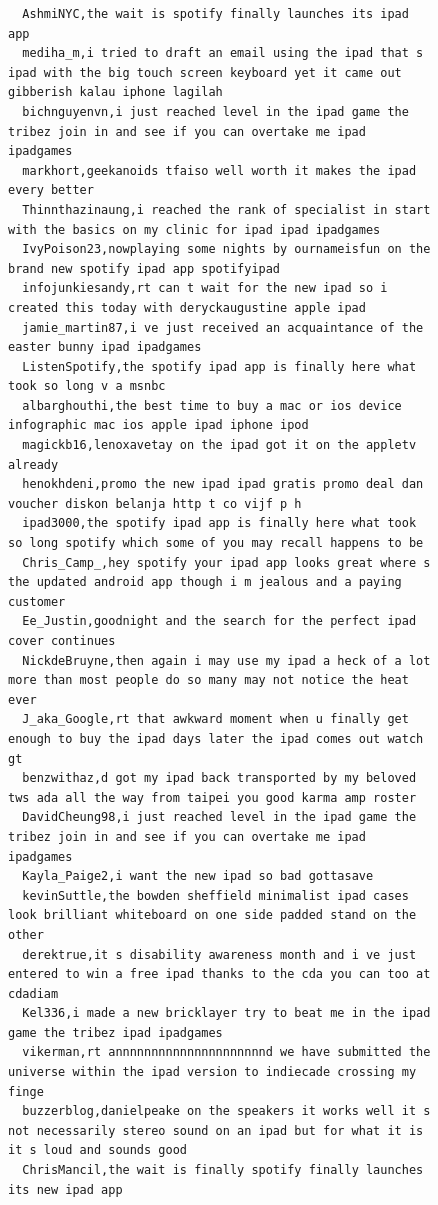 \begin{figure}[htpb]
\begin{verbatim}
  AshmiNYC,the wait is spotify finally launches its ipad app
  mediha_m,i tried to draft an email using the ipad that s ipad with the big touch screen keyboard yet it came out gibberish kalau iphone lagilah
  bichnguyenvn,i just reached level in the ipad game the tribez join in and see if you can overtake me ipad ipadgames
  markhort,geekanoids tfaiso well worth it makes the ipad every better
  Thinnthazinaung,i reached the rank of specialist in start with the basics on my clinic for ipad ipad ipadgames
  IvyPoison23,nowplaying some nights by ournameisfun on the brand new spotify ipad app spotifyipad
  infojunkiesandy,rt can t wait for the new ipad so i created this today with deryckaugustine apple ipad
  jamie_martin87,i ve just received an acquaintance of the easter bunny ipad ipadgames
  ListenSpotify,the spotify ipad app is finally here what took so long v a msnbc
  albarghouthi,the best time to buy a mac or ios device infographic mac ios apple ipad iphone ipod
  magickb16,lenoxavetay on the ipad got it on the appletv already
  henokhdeni,promo the new ipad ipad gratis promo deal dan voucher diskon belanja http t co vijf p h
  ipad3000,the spotify ipad app is finally here what took so long spotify which some of you may recall happens to be
  Chris_Camp_,hey spotify your ipad app looks great where s the updated android app though i m jealous and a paying customer
  Ee_Justin,goodnight and the search for the perfect ipad cover continues
  NickdeBruyne,then again i may use my ipad a heck of a lot more than most people do so many may not notice the heat ever
  J_aka_Google,rt that awkward moment when u finally get enough to buy the ipad days later the ipad comes out watch gt
  benzwithaz,d got my ipad back transported by my beloved tws ada all the way from taipei you good karma amp roster
  DavidCheung98,i just reached level in the ipad game the tribez join in and see if you can overtake me ipad ipadgames
  Kayla_Paige2,i want the new ipad so bad gottasave
  kevinSuttle,the bowden sheffield minimalist ipad cases look brilliant whiteboard on one side padded stand on the other
  derektrue,it s disability awareness month and i ve just entered to win a free ipad thanks to the cda you can too at cdadiam
  Kel336,i made a new bricklayer try to beat me in the ipad game the tribez ipad ipadgames
  vikerman,rt annnnnnnnnnnnnnnnnnnnnd we have submitted the universe within the ipad version to indiecade crossing my finge
  buzzerblog,danielpeake on the speakers it works well it s not necessarily stereo sound on an ipad but for what it is it s loud and sounds good
  ChrisMancil,the wait is finally spotify finally launches its new ipad app

\end{verbatim}
\end{figure}
